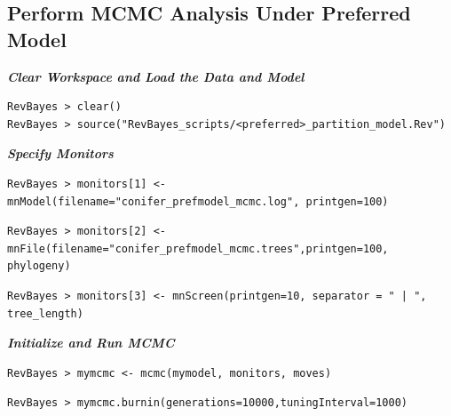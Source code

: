 \bigskip
\subsection{Perform MCMC Analysis Under Preferred Model}

\textbf{\textit{Clear Workspace and Load the Data and Model}}


{\tt \begin{snugshade*}
\begin{lstlisting}
RevBayes > clear()
RevBayes > source("RevBayes_scripts/<preferred>_partition_model.Rev")
\end{lstlisting}
\end{snugshade*}}

\textbf{\textit{Specify Monitors}}

{\tt \begin{snugshade*}
\begin{lstlisting}
RevBayes > monitors[1] <- mnModel(filename="conifer_prefmodel_mcmc.log", printgen=100)
\end{lstlisting}
\end{snugshade*}}


{\tt \begin{snugshade*}
\begin{lstlisting}
RevBayes > monitors[2] <- mnFile(filename="conifer_prefmodel_mcmc.trees",printgen=100, phylogeny)
\end{lstlisting}
\end{snugshade*}}


{\tt \begin{snugshade*}
\begin{lstlisting}
RevBayes > monitors[3] <- mnScreen(printgen=10, separator = " | ", tree_length)
\end{lstlisting}
\end{snugshade*}}

\textbf{\textit{Initialize and Run MCMC}}

{\tt \begin{snugshade*}
\begin{lstlisting}
RevBayes > mymcmc <- mcmc(mymodel, monitors, moves)
\end{lstlisting}
\end{snugshade*}}


{\tt \begin{snugshade*}
\begin{lstlisting}
RevBayes > mymcmc.burnin(generations=10000,tuningInterval=1000)
\end{lstlisting}
\end{snugshade*}}


